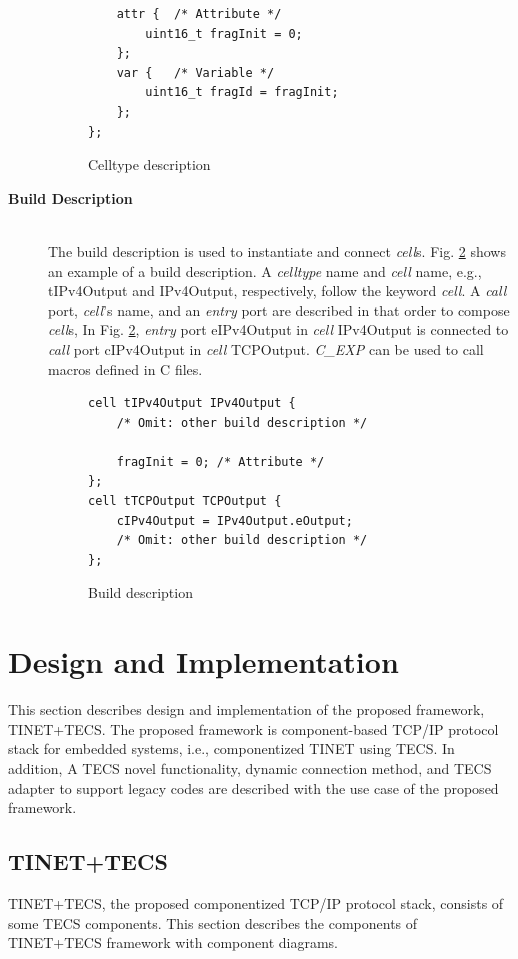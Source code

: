 \documentclass[conference]{IEEEtran/IEEEtran}
\begin{document}
\begin{description}
\begin{figure}[t]
\begin{lstlisting}
    attr {  /* Attribute */
        uint16_t fragInit = 0;
    };
    var {   /* Variable */
        uint16_t fragId = fragInit;
    };
};
\end{lstlisting}
\caption{Celltype description}
\label{src:celltype}
\end{figure}
    \item[{\bf Build Description}]\mbox{}\\
        The build description is used to instantiate and connect {\it cell}s.
        Fig. \ref{src:build} shows an example of a build description.
        A {\it celltype} name and {\it cell} name, e.g., tIPv4Output and IPv4Output, respectively, follow the keyword {\it cell}.
        A {\it call} port, {\it cell}'s name, and an {\it entry} port are described in that order to compose {\it cell}s,
        In Fig. \ref{src:build}, {\it entry} port eIPv4Output in {\it cell} IPv4Output is connected to {\it call} port cIPv4Output in {\it cell} TCPOutput.
        {\it C\_EXP} can be used to call macros defined in C files.

\begin{figure}[t]
\centering
\begin{lstlisting}
cell tIPv4Output IPv4Output {
    /* Omit: other build description */
    
    fragInit = 0; /* Attribute */
};
cell tTCPOutput TCPOutput {
    cIPv4Output = IPv4Output.eOutput;
    /* Omit: other build description */
};
\end{lstlisting}
\caption{Build description}
\label{src:build}
\end{figure}

\end{description}

\section{Design and Implementation}
\label{sec:Design and Implementation}

This section describes design and implementation of the proposed framework, TINET+TECS.
The proposed framework is component-based TCP/IP protocol stack for embedded systems, i.e., componentized TINET using TECS.
In addition, A TECS novel functionality, dynamic connection method, and TECS adapter to support legacy codes are described with the use case of the proposed framework.

\subsection{TINET+TECS}
TINET+TECS, the proposed componentized TCP/IP protocol stack, consists of some TECS components.
This section describes the components of TINET+TECS framework with component diagrams.
\end{document}
